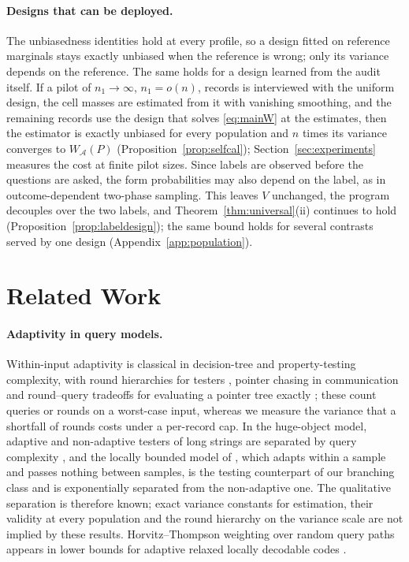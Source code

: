 \documentclass{article}
\newcommand{\A}{\mathcal A}
\begin{document}
\paragraph{Designs that can be deployed.}
The unbiasedness identities hold at every profile, so a design fitted on reference marginals stays exactly unbiased when the reference is wrong; only its variance depends on the reference. The same holds for a design learned from the audit itself. If a pilot of $n_1\to\infty$, $n_1=o(n)$, records is interviewed with the uniform design, the cell masses are estimated from it with vanishing smoothing, and the remaining records use the design that solves \eqref{eq:mainW} at the estimates, then the estimator is exactly unbiased for every population and $n$ times its variance converges to $W_\A(P)$ (Proposition~\ref{prop:selfcal}); Section~\ref{sec:experiments} measures the cost at finite pilot sizes. Since labels are observed before the questions are asked, the form probabilities may also depend on the label, as in outcome-dependent two-phase sampling. This leaves $V$ unchanged, the program decouples over the two labels, and Theorem~\ref{thm:universal}(ii) continues to hold (Proposition~\ref{prop:labeldesign}); the same bound holds for several contrasts served by one design (Appendix~\ref{app:population}).



\section{Related Work}\label{sec:related}
\paragraph{Adaptivity in query models.} Within-input adaptivity is classical in decision-tree and property-testing complexity, with round hierarchies for testers \citep{canonne2018}, pointer chasing in communication \citep{nisan1993} and round--query tradeoffs for evaluating a pointer tree exactly \citep{cook2012,li2026regex}; these count queries or rounds on a worst-case input, whereas we measure the variance that a shortfall of rounds costs under a per-record cap. In the huge-object model, adaptive and non-adaptive testers of long strings are separated by query complexity \citep{goldreich2022,chakraborty2023}, and the locally bounded model of \citet{adar2024}, which adapts within a sample and passes nothing between samples, is the testing counterpart of our branching class and is exponentially separated from the non-adaptive one. The qualitative separation is therefore known; exact variance constants for estimation, their validity at every population and the round hierarchy on the variance scale are not implied by these results. Horvitz--Thompson weighting over random query paths appears in lower bounds for adaptive relaxed locally decodable codes \citep{goldberg2026}.
\end{document}
